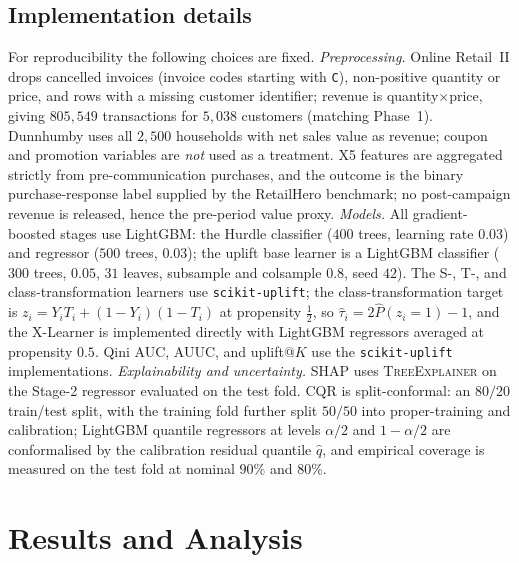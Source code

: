 \documentclass[pdflatex,sn-mathphys-num]{sn-jnl}
\theoremstyle{thmstyleone}
\theoremstyle{thmstylethree}
\begin{document}
\subsection{Implementation details}\label{sec:impl}
For reproducibility the following choices are fixed. \emph{Preprocessing.} Online Retail~II drops
cancelled invoices (invoice codes starting with \texttt{C}), non-positive quantity or price, and rows
with a missing customer identifier; revenue is quantity$\times$price, giving $805{,}549$ transactions
for $5{,}038$ customers (matching Phase~1). Dunnhumby uses all $2{,}500$ households with net sales
value as revenue; coupon and promotion variables are \emph{not} used as a treatment. X5 features are
aggregated strictly from pre-communication purchases, and the outcome is the binary purchase-response
label supplied by the RetailHero benchmark; no post-campaign revenue is released, hence the pre-period
value proxy. \emph{Models.} All gradient-boosted stages use LightGBM: the Hurdle classifier ($400$
trees, learning rate $0.03$) and regressor ($500$ trees, $0.03$); the uplift base learner is a
LightGBM classifier ($300$ trees, $0.05$, $31$ leaves, subsample and colsample $0.8$, seed $42$).
The S-, T-, and class-transformation learners use \texttt{scikit-uplift}; the class-transformation
target is $z_i=Y_iT_i+(1-Y_i)(1-T_i)$ at propensity $\tfrac12$, so $\hat\tau_i=2\hat P(z_i{=}1)-1$,
and the X-Learner is implemented directly with LightGBM regressors averaged at propensity $0.5$.
Qini AUC, AUUC, and uplift@$K$ use the \texttt{scikit-uplift} implementations. \emph{Explainability
and uncertainty.} SHAP uses \textsc{TreeExplainer} on the Stage-2 regressor evaluated on the test
fold. CQR is split-conformal: an $80/20$ train/test split, with the training fold further split
$50/50$ into proper-training and calibration; LightGBM quantile regressors at levels $\alpha/2$ and
$1-\alpha/2$ are conformalised by the calibration residual quantile $\hat q$, and empirical coverage
is measured on the test fold at nominal $90\%$ and $80\%$.

\section{Results and Analysis}\label{sec:results}


\end{document}

